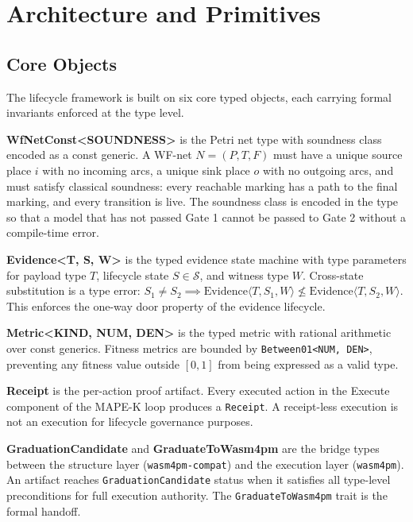 
\section{Architecture and Primitives}
\label{sec:lifecycle-architecture}

\subsection{Core Objects}
\label{sec:lifecycle-architecture-objects}

The lifecycle framework is built on six core typed objects, each carrying formal
invariants enforced at the type level.

\textbf{WfNetConst\textless SOUNDNESS\textgreater} is the Petri net type with soundness
class encoded as a const generic. A WF-net $N = (P, T, F)$ must have a unique source
place $i$ with no incoming arcs, a unique sink place $o$ with no outgoing arcs, and must
satisfy classical soundness: every reachable marking has a path to the final marking,
and every transition is live. The soundness class is encoded in the type so that a
model that has not passed Gate 1 cannot be passed to Gate 2 without a compile-time error.

\textbf{Evidence\textless T, S, W\textgreater} is the typed evidence state machine with
type parameters for payload type $T$, lifecycle state $S \in \mathcal{S}$, and witness
type $W$. Cross-state substitution is a type error: $S_1 \neq S_2 \implies
\mathrm{Evidence}\langle T, S_1, W \rangle \not\leq \mathrm{Evidence}\langle T, S_2, W \rangle$.
This enforces the one-way door property of the evidence lifecycle.

\textbf{Metric\textless KIND, NUM, DEN\textgreater} is the typed metric with rational
arithmetic over const generics. Fitness metrics are bounded by
\texttt{Between01\textless NUM, DEN\textgreater}, preventing any fitness value outside
$[0, 1]$ from being expressed as a valid type.

\textbf{Receipt} is the per-action proof artifact. Every executed action in the Execute
component of the MAPE-K loop produces a \texttt{Receipt}. A receipt-less execution is
not an execution for lifecycle governance purposes.

\textbf{GraduationCandidate} and \textbf{GraduateToWasm4pm} are the bridge types between
the structure layer (\texttt{wasm4pm-compat}) and the execution layer (\texttt{wasm4pm}).
An artifact reaches \texttt{GraduationCandidate} status when it satisfies all type-level
preconditions for full execution authority. The \texttt{GraduateToWasm4pm} trait is the
formal handoff.

